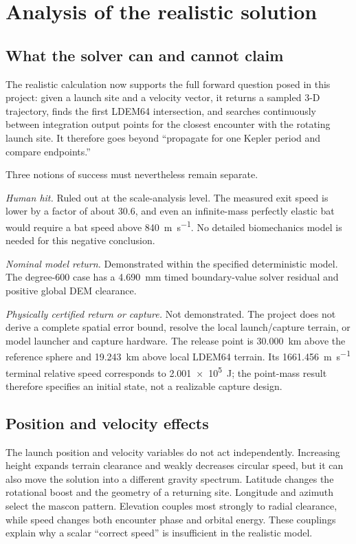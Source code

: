 \section{Analysis of the realistic solution}

\subsection{What the solver can and cannot claim}

The realistic calculation now supports the full forward question posed in
this project: given a launch site and a velocity vector, it returns a sampled
3-D trajectory, finds the first LDEM64 intersection, and searches continuously
between integration output points for the closest encounter with the rotating
launch site. It therefore goes beyond ``propagate for one Kepler period and
compare endpoints.''

Three notions of success must nevertheless remain separate.

\emph{Human hit.} Ruled out at the scale-analysis level. The measured exit speed is lower by a factor of about 30.6, and even an infinite-mass perfectly elastic bat would require a bat speed above \SI{840}{\metre\per\second}. No detailed biomechanics model is needed for this negative conclusion.

\emph{Nominal model return.} Demonstrated within the specified deterministic
model. The degree-600 case has a \SI{4.690}{mm} timed boundary-value solver
residual and positive global DEM clearance.

\emph{Physically certified return or capture.} Not demonstrated. The project does not derive a complete spatial error bound, resolve the local launch/capture terrain, or model launcher and capture hardware. The release point is \SI{30.000}{km} above the reference sphere and \SI{19.243}{km} above local LDEM64 terrain. Its \SI{1661.456}{\metre\per\second} terminal relative speed corresponds to \SI{2.001e5}{J}; the point-mass result therefore specifies an initial state, not a realizable capture design.

\subsection{Position and velocity effects}

The launch position and velocity variables do not act independently.
Increasing height expands terrain clearance and weakly decreases circular
speed, but it can also move the solution into a different gravity spectrum.
Latitude changes the rotational boost and the geometry of a returning site.
Longitude and azimuth select the mascon pattern. Elevation couples most
strongly to radial clearance, while speed changes both encounter phase and
orbital energy. These couplings explain why a scalar ``correct speed'' is
insufficient in the realistic model.

